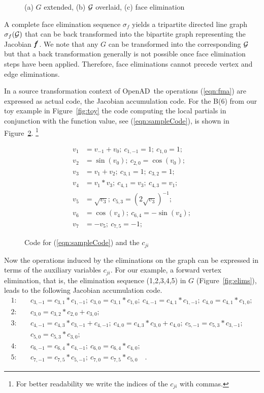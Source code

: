 \documentclass[acmtocl,acmnow]{acmtrans2m}
\newcommand{\OpenAD}{OpenAD}
\newcommand{\bmf}{\mbox{\bf\em f}}
\newcommand{\refeqn}[1]{(\ref{#1})}
\newcommand{\reffig}[1]{Figure~\ref{#1}}
\begin{document}
\begin{figure}
\centering
{}
\caption{
(a) $G$ extended, 
(b) $\cal G$ overlaid, 
(c) face elimination 
}
\label{fig:face_elims}
\end{figure}
A complete face elimination sequence $\sigma_f$ yields a tripartite 
directed line graph $\sigma_f({\cal G})$ that can be back transformed into 
the bipartite graph representing the Jacobian $\bmf'$.
We note that any $G$ can be transformed into the 
corresponding $\cal G$ but that a back transformation 
generally is not  possible once face elimination steps have been applied. 
Therefore, face eliminations cannot precede vertex and edge 
eliminations.

In a source transformation context of \OpenAD\ the operations \refeqn{eqn:fma} are 
expressed as actual code, the Jacobian accumulation code. For the 
B(6) from our toy example in \reffig{fig:toy} the code computing 
the local partials in conjunction with the function value, see \refeqn{eqn:sampleCode}, 
is shown in 
\reffig{fig:toyAndPartials}.
\footnote{
For better readability we write the indices of the $c_{ji}$ with commas.
} 
\begin{figure}
\begin{minipage}{\linewidth}
\begin{align*}
 v_1&=v_{-1}+v_0;~c_{1,-1}=1;~c_{1,0}=1; \\
 v_2&=\sin(v_0);~c_{2,0}=\cos(v_0); \\
 v_3&=v_1+v_2;~c_{3,1}=1;~c_{3,2}=1; \\
 v_4&=v_1*v_3;~c_{4,1}=v_3;~c_{4,3}=v_1; \\
 v_5&=\sqrt{v_3};~c_{5,3}=(2\sqrt{v_3})^{-1}; \\
 v_6&=\cos(v_4);~c_{6,4}=-\sin(v_4); \\
 v_7&=-v_5;~c_{7,5}=-1;
\end{align*}
\end{minipage}
\caption{Code for \refeqn{eqn:sampleCode} and the $c_{ji}$}\label{fig:toyAndPartials}
\end{figure}
Now the operations induced by the eliminations on the graph can 
be expressed in terms of the auxiliary variables $c_{ji}$.
For our example, a forward vertex elimination, that is, the elimination
sequence (1,2,3,4,5) in $G$ (\reffig{fig:elims}), leads to the
following Jacobian accumulation code.
{
\begin{align*}
1:\quad  &c_{3,-1}=c_{3,1} * c_{1,-1};~c_{3,0}=c_{3,1} * c_{1,0};~c_{4,-1}=c_{4,1} * c_{1,-1};~c_{4,0}=c_{4,1} * c_{1,0}; \\
2:\quad  &c_{3,0}=c_{3,2} * c_{2,0}+c_{3,0}; \\
3:\quad  &c_{4,-1}=c_{4,3} * c_{3,-1}+c_{4,-1};~c_{4,0}=c_{4,3} * c_{3,0}+c_{4,0};~c_{5,-1}=c_{5,3} * c_{3,-1}; \\
&c_{5,0}=c_{5,3} * c_{3,0}; \\
4:\quad  &c_{6,-1}=c_{6,4} * c_{4,-1};~c_{6,0}=c_{6,4} * c_{4,0}; \\
5:\quad  &c_{7,-1}=c_{7,5} * c_{5,-1};~c_{7,0}=c_{7,5} * c_{5,0} \quad .
\end{align*}
}
\end{document}

